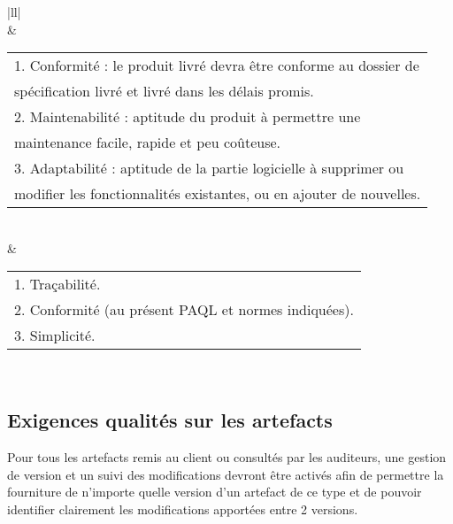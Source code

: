 \documentclass[a4paper,11pt,titlepage]{article}
\begin{document}
\begin{table}[H]
    \begin{tabular}{|ll|}
        \hline
                                                                       \\ \hline
                 &
        \begin{tabular}[c]{@{}l@{}}
            1.    Conformité : le produit livré devra être conforme au dossier de \\spécification livré et livré dans les délais promis.\\
            2.    Maintenabilité : aptitude du produit à permettre une            \\ maintenance facile, rapide et peu coûteuse.\\
            3.    Adaptabilité : aptitude de la partie logicielle à supprimer ou  \\ modifier les fonctionnalités existantes, ou en ajouter de nouvelles. \\
        \end{tabular} \\ \hline
         &
        \begin{tabular}[c]{@{}l@{}}
            1.    Traçabilité.                                      \\
            2.    Conformité (au présent PAQL et normes indiquées). \\
            3.    Simplicité.\end{tabular}                                                                                       \\ \hline
    \end{tabular}
\end{table}


\subsection{Exigences qualités sur les artefacts} \label{sec:ExQualiArte}
Pour tous les artefacts remis au client ou consultés par les auditeurs,
une gestion de version et un suivi des modifications devront être activés
afin de permettre la fourniture de n'importe quelle version d'un artefact
de ce type et de pouvoir identifier clairement les modifications apportées
entre 2 versions.
\end{document}
